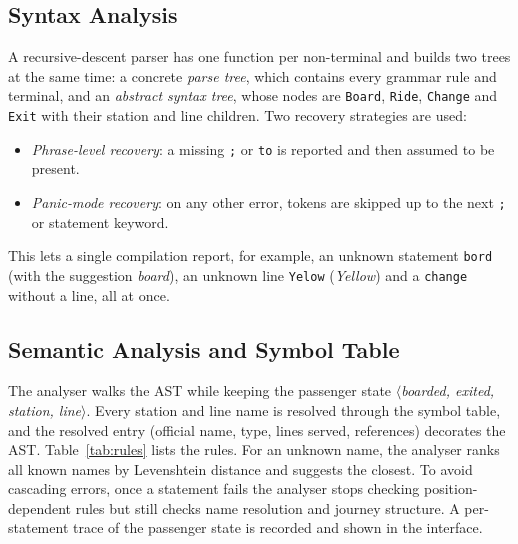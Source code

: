 \documentclass[conference]{IEEEtran}
\begin{document}
\subsection{Syntax Analysis}
A recursive-descent parser has one function per non-terminal and builds two trees at the same time: a concrete \emph{parse tree}, which contains every grammar rule and terminal, and an \emph{abstract syntax tree}, whose nodes are \texttt{Board}, \texttt{Ride}, \texttt{Change} and \texttt{Exit} with their station and line children. Two recovery strategies are used:
\begin{itemize}
\item \emph{Phrase-level recovery}: a missing \texttt{;} or \texttt{to} is reported and then assumed to be present.
\item \emph{Panic-mode recovery}: on any other error, tokens are skipped up to the next \texttt{;} or statement keyword.
\end{itemize}
This lets a single compilation report, for example, an unknown statement \texttt{bord} (with the suggestion \emph{board}), an unknown line \texttt{Yelow} (\emph{Yellow}) and a \texttt{change} without a line, all at once.

\subsection{Semantic Analysis and Symbol Table}
The analyser walks the AST while keeping the passenger state $\langle$\emph{boarded, exited, station, line}$\rangle$. Every station and line name is resolved through the symbol table, and the resolved entry (official name, type, lines served, references) decorates the AST. Table~\ref{tab:rules} lists the rules. For an unknown name, the analyser ranks all known names by Levenshtein distance and suggests the closest. To avoid cascading errors, once a statement fails the analyser stops checking position-dependent rules but still checks name resolution and journey structure. A per-statement trace of the passenger state is recorded and shown in the interface.
\end{document}
